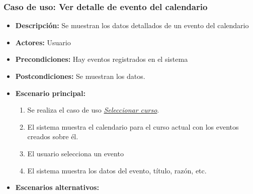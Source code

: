 \documentclass{book}
\begin{document}
\begin{comment}
		\begin{enumerate}
			\item El caso de uso vuelve al paso anterior.
		\end{enumerate}
		\item[7.a] No hay asignaturas registradas para mostrar.
		\begin{enumerate}
			\item El caso de uso finaliza.
		\end{enumerate}
		\item[9.a] La asignatura no puede estar en ese horario por alguna razón.
		\begin{enumerate}
			\item El sistema muestra el error y se vuelve al paso anterior.
		\end{enumerate}
	\end{itemize}
\end{itemize}

\pagebreak
\end{comment}
\subsubsection*{Caso de uso: Ver detalle de evento del calendario}
\begin{itemize}
\item{\bf Descripción:} Se muestran los datos detallados de un evento del calendario
\item{\bf Actores:} Usuario
\item{\bf Precondiciones:} Hay eventos registrados en el sistema
\item{\bf Postcondiciones:} Se muestran los datos.
\item{\bf Escenario principal:}
	\begin{enumerate}
	\item Se realiza el caso de uso {\em \hyperref[select_curso]{Seleccionar curso}}.
	\item El sistema muestra el calendario para el curso actual con los eventos creados sobre él.
	\item El usuario selecciona un evento
	\item El sistema muestra los datos del evento, título, razón, etc.
	\end{enumerate}
\item{\bf Escenarios alternativos:}
\end{itemize}

\pagebreak
\end{document}
